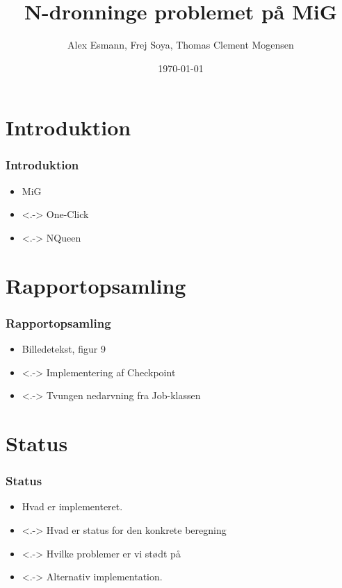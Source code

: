 \documentclass{beamer}
\title{N-dronninge problemet på MiG}
\author{Alex Esmann, Frej Soya, Thomas Clement Mogensen}
\date{\today}
\begin{document}
\frame{\titlepage}
\section{Introduktion}
\frame
{
	\frametitle{Introduktion}

	\begin{itemize}
	\item<1-> MiG
	\item<.-> One-Click
	\item<.-> NQueen
	\end{itemize}
}


\section{Rapportopsamling}
\frame
{
  \frametitle{Rapportopsamling}

  \begin{itemize}
  \item<1-> Billedetekst, figur 9
  \item<.-> Implementering af Checkpoint 
  \item<.-> Tvungen nedarvning fra Job-klassen
  \end{itemize}
}

\section{Status}
\frame
{
  \frametitle{Status}

  \begin{itemize}
  \item<1-> Hvad er implementeret.
  \item<.-> Hvad er status for den konkrete beregning
  \item<.-> Hvilke problemer er vi stødt på
  \item<.-> Alternativ implementation.
  \end{itemize}
}
\end{document}
